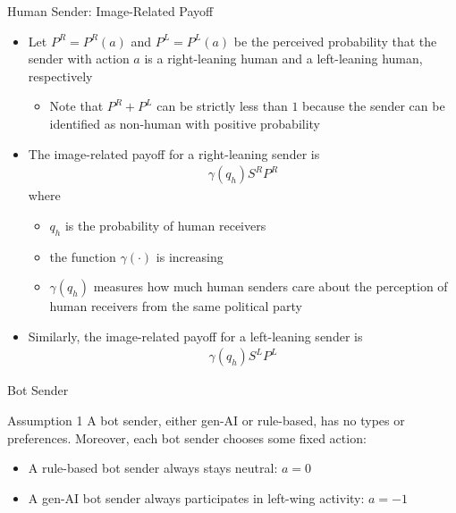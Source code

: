 \documentclass[9pt,aspectratio=1610]{beamer}
\begin{document}
\begin{frame}{Human Sender: Image-Related Payoff}
\begin{itemize}\setlength{\itemsep}{1em}
    \item Let $P^R = P^R(a)$ and $P^L = P^L(a)$ be the perceived probability that the sender with action $a$ is a right-leaning human and a left-leaning human, respectively
    \begin{itemize}
        \item Note that $P^R+P^L$ can be strictly less than $1$ because the sender can be identified as non-human with positive probability
    \end{itemize}
    \item The image-related payoff for a right-leaning sender is
    \begin{align*}
        \gamma(q_h)S^R P^R
    \end{align*}
    where
    \begin{itemize}
        \item $q_h$ is the probability of human receivers
        \item the function $\gamma(\cdot)$ is increasing
        \item $\gamma(q_h)$ measures how much human senders care about the perception of human receivers from the same political party
    \end{itemize}
    \item Similarly, the image-related payoff for a left-leaning sender is
    \begin{align*}
        \gamma(q_h)S^LP^L
    \end{align*}
\end{itemize}
\end{frame}

\begin{frame}{Bot Sender}

\begin{exampleblock}{Assumption 1}
     A bot sender, either gen-AI or rule-based, has no types or preferences. Moreover, each bot sender chooses some fixed action:
     \begin{itemize}
         \item A rule-based bot sender always stays neutral: $a=0$
         \item A gen-AI bot sender always participates in left-wing activity: $a = -1$
     \end{itemize}
\end{exampleblock}

\end{frame}
\end{document}
